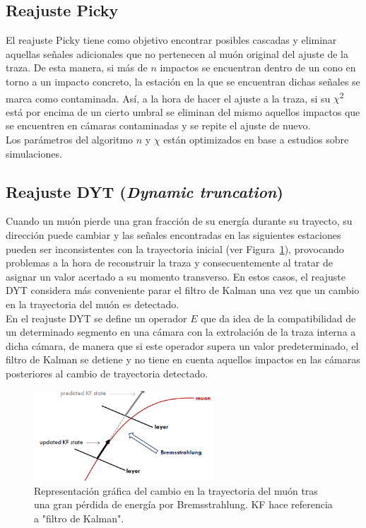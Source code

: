 \subsection{Reajuste Picky}\label{sec:Picky}

El reajuste Picky tiene como objetivo encontrar posibles cascadas y eliminar aquellas se\~nales adicionales que no pertenecen al mu\'on original del ajuste de la traza. De esta manera, si m\'as de $n$ impactos se encuentran dentro de un cono en torno a un impacto concreto, la estaci\'on en la que se encuentran dichas se\~nales se marca como contaminada. As\'i, a la hora de hacer el ajuste a la traza, si su $\chi$\textsuperscript{2} est\'a por encima de un cierto umbral se eliminan del mismo aquellos impactos que se encuentren en c\'amaras contaminadas y se repite el ajuste de nuevo. \\
Los par\'ametros del algoritmo $n$ y $\chi$ est\'an optimizados en base a estudios sobre simulaciones.

\subsection{Reajuste DYT (\textit{Dynamic truncation})}\label{sec:DYT}

Cuando un mu\'on pierde una gran fracci\'on de su energ\'ia durante su trayecto, su direcci\'on puede cambiar y las se\~nales encontradas en las siguientes estaciones pueden ser inconsistentes con la trayectoria inicial (ver Figura~\ref{fig:energyloss}), provocando problemas a la hora de reconstruir la traza y consecuentemente al tratar de asignar un valor acertado a su momento transverso. En estos casos, el reajuste DYT considera m\'as conveniente parar el filtro de Kalman una vez que un cambio en la trayectoria del mu\'on es detectado. \\
En el reajuste DYT se define un operador $E$ que da idea de la compatibilidad de un determinado segmento en una c\'amara con la extrolaci\'on de la traza interna a dicha c\'amara, de manera que si este operador supera un valor predeterminado, el filtro de Kalman se detiene y no tiene en cuenta aquellos impactos en las c\'amaras posteriores al cambio de trayectoria detectado. 

\begin{figure}[h]
\centering
\includegraphics[width=0.60\textwidth]{figures/energyloss.png}
\caption{Representaci\'on gr\'afica del cambio en la trayectoria del mu\'on tras una gran p\'erdida de energ\'ia por Bremsstrahlung. KF hace referencia a "filtro de Kalman".}
\label{fig:energyloss}        
\end{figure}


